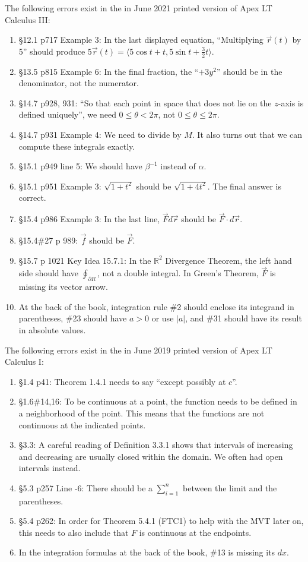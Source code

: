 \documentclass{amsart}
\newcommand{\ds}{\displaystyle}
\begin{document}
The following errors exist in the in June 2021 printed version of Apex LT Calculus III:
\begin{enumerate}
\item \S12.1 p717 Example 3: In the last displayed equation, ``Multiplying $\vec r(t)$ by 5'' should produce $5\vec r(t)=\langle5\cos t+t,5\sin t+\frac32t\rangle$.
\item \S13.5 p815 Example 6: In the final fraction, the ``$+3y^2$'' should be in the denominator, not the numerator.
\item \S14.7 p928, 931: ``So that each point in space that does not lie on the $z$-axis is defined uniquely'', we need $0\le\theta<2\pi$, not $0\le\theta\le2\pi$.
\item \S14.7 p931 Example 4: We need to divide by $M$.  It also turns out that we can compute these integrals exactly.
\item \S15.1 p949 line 5: We should have $\beta^{-1}$ instead of $\alpha$.
\item \S15.1 p951 Example 3: $\sqrt{1+t^2}$ should be $\sqrt{1+4t^2}$.  The final answer is correct.
\item \S15.4 p986 Example 3: In the last line, $\vec Fd\vec r$ should be $\vec F\cdot d\vec r$.
\item \S15.4\#27 p 989: $\vec f$ should be $\vec F$.
\item \S15.7 p 1021 Key Idea 15.7.1: In the $\mathbb{R}^2$ Divergence Theorem, the left hand side should have $\oint_{\partial R}$, not a double integral.  In Green's Theorem, $\vec F$ is missing its vector arrow.
\item At the back of the book, integration rule \#2 should enclose its integrand in parentheses, \#23 should have $a>0$ or use $|a|$, and \#31 should have its result in absolute values.
\label{2021-06-00III}
\end{enumerate}

The following errors exist in the in June 2019 printed version of Apex LT Calculus I:
\begin{enumerate}
\item \S1.4 p41: Theorem 1.4.1 needs to say ``except possibly at $c$''.
\item \S1.6\#14,16: To be continuous at a point, the function needs to be defined in a neighborhood of the point.  This means that the functions are not continuous at the indicated points.
\item \S3.3: A careful reading of Definition 3.3.1 shows that intervals of increasing and decreasing are usually closed within the domain.  We often had open intervals instead.
\item \S5.3 p257 Line -6: There should be a $\ds\sum_{i=1}^n$ between the limit and the parentheses.
\item \S5.4 p262: In order for Theorem 5.4.1 (FTC1) to help with the MVT later on, this needs to also include that $F$ is continuous at the endpoints.
\item In the integration formulas at the back of the book, \#13 is missing its $dx$.
\label{2019-06-00Iplus}
\end{enumerate}
\end{document}
